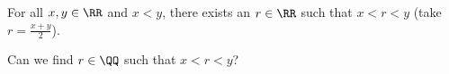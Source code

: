 

\noindent For all $x,y\in \RR$ and $x<y$, there exists an $r\in \RR$ such that $x<r<y$ (take $r = \frac{x+y}{2}$). 
\begin{question}
Can we find $r\in \QQ$ such that $x<r<y$?
\end{question}

